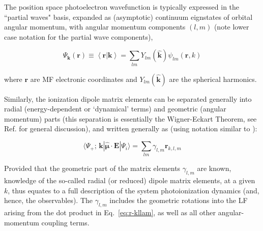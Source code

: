 \documentclass[10pt]{article}
\begin{document}
The position space photoelectron wavefunction is typically expressed in the ``partial waves" basis, expanded as (asymptotic) continuum eignstates of orbital angular momentum, with angular momentum components $(l,m)$ (note lower case notation for the partial wave components),  


\begin{equation}
\Psi_\mathbf{k}(\mathbf{r})\equiv\left<\mathbf{r}|\mathbf{k}\right> = \sum_{lm}Y_{lm}(\mathbf{\hat{k}})\psi_{lm}(\mathbf{r},k)
\label{eq:elwf}
\end{equation}

where $\mathbf{r}$ are MF electronic coordinates and $Y_{lm}(\mathbf{\hat{k}})$ are the spherical harmonics.

Similarly, the ionization dipole matrix elements can be separated generally into radial (energy-dependent or `dynamical' terms) and geometric (angular momentum) parts (this separation is essentially the Wigner-Eckart Theorem, see Ref. \cite{zareAngMom} for general discussion), and written generally as (using notation similar to \cite{Reid1991}): 

\begin{equation}
\langle\Psi_{+};\,\mathbf{k}|\hat{\mathbf{\mu}}\cdot\boldsymbol{\mathbf{E}}|\Psi_{i}\rangle = \sum_{lm}\gamma_{l,m}\mathbf{r}_{k,l,m}
\label{eq:r-kllam}
\end{equation}


Provided that the geometric part of the matrix elements $\gamma_{l,m}$ are known, knowledge of the so-called radial (or reduced) dipole matrix elements, at a given 
$k$, %
thus equates to a full description of the system photoionization dynamics (and, hence, the observables). The $\gamma_{l,m}$ includes the geometric rotations  into the LF arising from the dot product in Eq.~\ref{eq:r-kllam}, as well as all other angular-momentum coupling terms.

\end{document}
